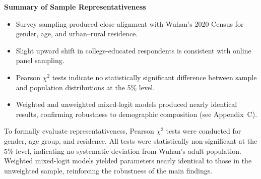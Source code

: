 \begin{tcolorbox}[
    colback=gray!5,
    colframe=gray!50,
    boxrule=0.6pt,
    arc=3pt,
    left=6pt,
    right=6pt,
    top=6pt,
    bottom=6pt
]
\textbf{Summary of Sample Representativeness}

\begin{itemize}[leftmargin=1.2em]
    \item Survey sampling produced close alignment with Wuhan’s 2020 Census for gender, 
          age, and urban--rural residence.
    \item Slight upward shift in college-educated respondents is consistent with online 
          panel sampling.
    \item Pearson $\chi^2$ tests indicate no statistically significant difference between 
          sample and population distributions at the 5\% level.
    \item Weighted and unweighted mixed-logit models produced nearly identical results, 
          confirming robustness to demographic composition (see Appendix~C).
\end{itemize}
\end{tcolorbox}

To formally evaluate representativeness, Pearson $\chi^2$ tests were conducted for gender, 
age group, and residence. All tests were statistically non-significant at the 5\% level, 
indicating no systematic deviation from Wuhan’s adult population. Weighted mixed-logit 
models yielded parameters nearly identical to those in the unweighted sample, reinforcing 
the robustness of the main findings.

